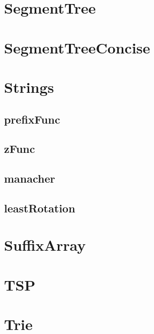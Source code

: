 \documentclass[a4paper]{article}
\begin{document}
\section{SegmentTree}
\section{SegmentTreeConcise}
\section{Strings}
\subsection{prefixFunc}
\subsection{zFunc}
\subsection{manacher}
\subsection{leastRotation}
\section{SuffixArray}
\section{TSP}
\section{Trie}
\end{document}
